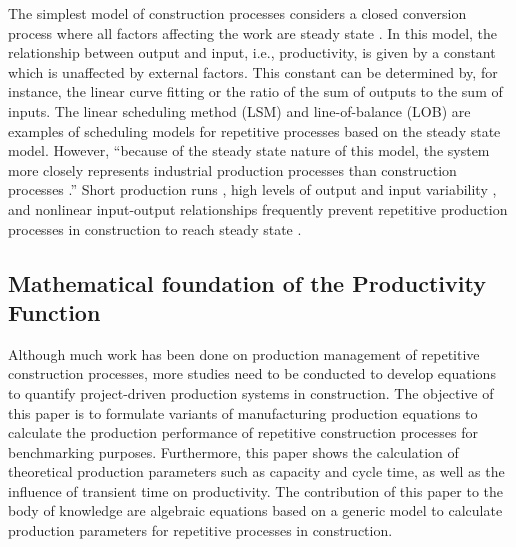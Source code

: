 \documentclass{article}
\begin{document}
The simplest model of construction processes considers a closed conversion process where all factors affecting the work are steady state \cite{Drewin1982}.
In this model, the relationship between output and input, i.e., productivity, is given by a constant which is unaffected by external factors.
This constant can be determined by, for instance, the linear curve fitting or the ratio of the sum of outputs to the sum of inputs.
The linear scheduling method (LSM) \cite{Harmelink1998,Su2016} and line-of-balance (LOB) \cite{Lumsden1968,Su2016,ZolfagharDolabi2014} are examples of scheduling models for repetitive processes based on the steady state model.
However, ``because of the steady state nature of this model, the system more closely represents industrial production processes than construction processes \cite{Thomas1990}.'' Short production runs \cite{Bashford2005}, high levels of output and input variability \cite{Gonzalez2009}, and nonlinear input-output relationships \cite{Bertelsen2003,Lutz1993} frequently prevent repetitive production processes in construction to reach steady state \cite{Antunes2015a,Walsh2007}.

\subsection{Mathematical foundation of the Productivity Function}
\label{sec:orgfec4568}



Although much work has been done on production management of repetitive construction processes, more studies need to be conducted to develop equations to quantify project-driven production systems in construction.
The objective of this paper is to formulate variants of manufacturing production equations to calculate the production performance of repetitive construction processes for benchmarking purposes.
Furthermore, this paper shows the calculation of theoretical production parameters such as capacity and cycle time, as well as the influence of transient time on productivity.
The contribution of this paper to the body of knowledge are algebraic equations based on a generic model to calculate production parameters for repetitive processes in construction.
\end{document}
